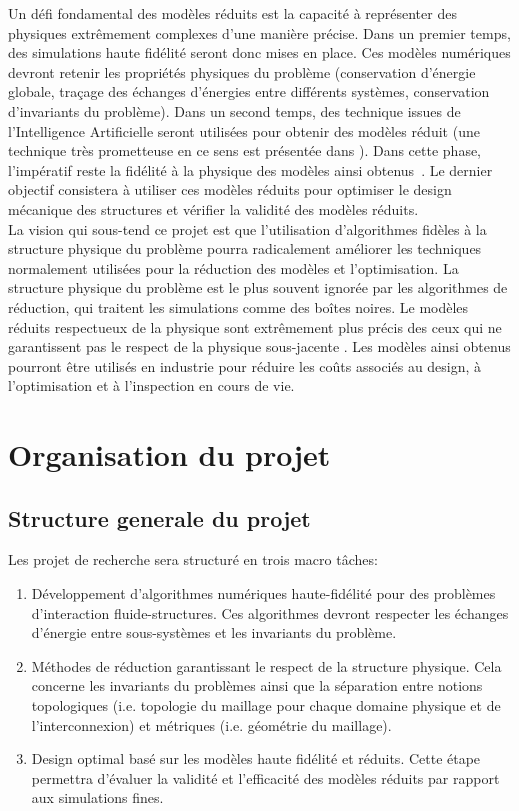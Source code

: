 \documentclass[french]{article}
\begin{document}
Un défi fondamental des modèles réduits est la capacité \`a représenter des physiques extrêmement complexes d'une manière précise. 
Dans un premier temps, des simulations haute fidélité seront donc mises en place. Ces modèles numériques devront retenir les propriétés physiques du problème (conservation d'énergie globale, traçage des échanges d'énergies entre différents systèmes, conservation d'invariants du problème). Dans un second temps, des technique issues de l'Intelligence Artificielle seront utilisées pour obtenir des modèles réduit (une technique très prometteuse en ce sens est présentée dans \cite{lee2020}). Dans cette phase, l'impératif reste la fidélité \`a la physique des modèles ainsi obtenus~\cite{willcox2021}. Le dernier objectif consistera \`a utiliser ces modèles réduits pour optimiser le design mécanique des structures et vérifier la validité des modèles réduits.\\

La vision qui sous-tend ce projet est que l'utilisation d'algorithmes fidèles \`a la structure physique du problème pourra radicalement améliorer les techniques normalement utilisées pour la réduction des modèles et l'optimisation. La structure physique du problème est le plus souvent ignorée par les algorithmes de réduction, qui traitent les simulations comme des bo\^{i}tes noires. Le modèles réduits respectueux de la physique sont extrêmement plus précis des ceux qui ne garantissent pas le respect de la physique sous-jacente \cite{lee2020}. Les modèles ainsi obtenus pourront être utilisés en industrie pour réduire les  co\^{u}ts associés au design, \`a l'optimisation et \`a l'inspection en cours de vie.

\section{Organisation du projet}

\subsection{Structure generale du projet}

Les projet de recherche sera structuré en trois macro tâches:
\begin{enumerate}
	\item Développement d'algorithmes numériques haute-fidélité pour des problèmes d'interaction fluide-structures. Ces algorithmes devront respecter les échanges d'énergie entre sous-systèmes et les invariants du problème.
	\item Méthodes de réduction garantissant le respect de la structure physique. Cela concerne les invariants du problèmes ainsi que la séparation entre notions topologiques (i.e. topologie du maillage pour chaque domaine physique et  de l'interconnexion) et métriques (i.e. géométrie du maillage).
	\item Design optimal basé sur les modèles haute fidélité et réduits. Cette étape permettra d'évaluer la validité et l'efficacit\'e des modèles réduits par rapport aux simulations fines.
\end{enumerate}
\end{document}
